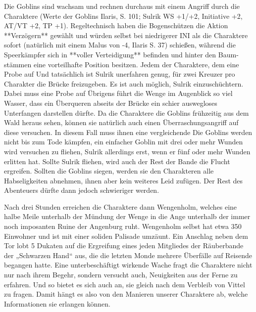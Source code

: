 Die Goblins sind wachsam und rechnen durchaus mit einem Angriff durch die Charaktere (Werte der Goblins Ilaris, S. 101; Sulrik WS +1/+2, Initiative +2, AT/VT +2, TP +1). Regeltechnisch haben die Bogenschützen die Aktion **Verzögern** gewählt und würden selbst bei niedrigerer INI als die Charaktere sofort (natürlich mit einem Malus von -4, Ilaris S. 37) schießen, während die Speerkämpfer sich in **voller Verteidigung** befinden und hinter den Baum-stämmen eine vorteilhafte Position besitzen.
\platz
Jedem der Charaktere, dem eine Probe auf 
\platz
{}
\platz
Und tatsächlich ist Sulrik unerfahren genug, für zwei Kreuzer pro Charakter die Brücke freizugeben. Es ist auch möglich, Sulrik einzuschüchtern. Dabei muss eine Probe auf
\platz
{}
\platz
Übrigens führt die Wenge im Augenblick so viel Wasser, dass ein Überqueren abseits der Brücke ein schier auswegloses Unterfangen darstellen dürfte. 
\platz
Da die Charaktere die Goblins frühzeitig aus dem Wald heraus sehen, können sie natürlich auch einen Überraschungsangriff auf diese versuchen. In diesem Fall muss ihnen eine vergleichende 
\platz
{}
\platz
Die Goblins werden nicht bis zum Tode kämpfen, ein einfacher Goblin mit drei oder mehr Wunden wird versuchen zu fliehen, Sulrik allerdings erst, wenn er fünf oder mehr Wunden erlitten hat. Sollte Sulrik fliehen, wird auch der Rest der Bande die Flucht ergreifen. Sollten die Goblins siegen, werden sie den Charakteren alle Habseligkeiten abnehmen, ihnen aber kein weiteres Leid zufügen. Der Rest des Abenteuers dürfte dann jedoch schwieriger werden. 





\platz
Nach drei Stunden erreichen die Charaktere dann Wengenholm, welches eine halbe Meile unterhalb der Mündung der Wenge in die Ange unterhalb der immer noch imposanten Ruine der Angenburg ruht. Wengenholm selbst hat etwa 350 Einwohner und ist mit einer soliden Palisade umzäunt. Ein Anschlag neben dem Tor lobt 5 Dukaten auf die Ergreifung eines jeden Mitgliedes der Räuberbande der „Schwarzen Hand“ aus, die die letzten Monde mehrere Überfälle auf Reisende begangen hatte. Eine unterbeschäftigt wirkende Wache fragt die Charaktere nicht nur nach ihrem Begehr, sondern versucht auch, Neuigkeiten aus der Ferne zu erfahren. Und so bietet es sich auch an, sie gleich nach dem Verbleib von Vittel zu fragen. Damit hängt es also von den Manieren unserer Charaktere ab, welche Informationen sie erlangen können. 


